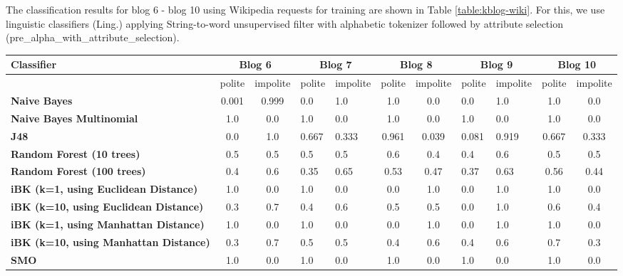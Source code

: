 \documentclass[conference]{IEEEtran}
\begin{document}
The classification results for blog 6 - blog 10 using Wikipedia requests for training are shown in Table \ref{table:kblog-wiki}. For this, we use linguistic classifiers (Ling.) applying String-to-word unsupervised filter with alphabetic tokenizer followed by attribute selection (pre\_alpha\_with\_attribute\_selection). 

\begin{table*}[htbp]
\caption{Classification results using Wikipedia requests for training for blog 6 - blog 10}
\centering
\vspace{5pt}
\begin{tabular}{|l|c|c|l|l|c|c|l|l|c|c|}
\hline
\textbf{Classifier} & \multicolumn{2}{|c|}{\textbf{Blog 6}} & \multicolumn{2}{|c|}{\textbf{Blog 7}} & \multicolumn{2}{|c|}{\textbf{Blog 8}} & \multicolumn{2}{|c|}{\textbf{Blog 9}} & \multicolumn{2}{|c|}{\textbf{Blog 10}} \\
\hline
& polite & impolite & polite & impolite & polite & impolite & polite & impolite & polite & impolite \\
\hline\hline
\textbf{Naive Bayes} & 0.001 & 0.999 & 0.0 & 1.0 & 1.0 & 0.0 & 0.0 & 1.0 & 1.0 & 0.0 \\ 
\hline
\textbf{Naive Bayes Multinomial} & 1.0 & 0.0 & 1.0 & 0.0 & 1.0 & 0.0 & 1.0 & 0.0 & 1.0 & 0.0 \\ 
\hline
\textbf{J48} & 0.0 & 1.0 & 0.667 & 0.333 & 0.961 & 0.039 & 0.081 & 0.919 & 0.667 & 0.333 \\ 
\hline
\textbf{Random Forest (10 trees)} & 0.5 & 0.5 & 0.5 & 0.5 & 0.6 & 0.4 & 0.4 & 0.6 & 0.5 & 0.5 \\ 
\hline
\textbf{Random Forest (100 trees)} & 0.4 & 0.6 & 0.35 & 0.65 & 0.53 & 0.47 & 0.37 & 0.63 & 0.56 & 0.44 \\ 
\hline
\textbf{iBK (k=1, using Euclidean Distance)} & 1.0 & 0.0 & 1.0 & 0.0 & 0.0 & 1.0 & 0.0 & 1.0 & 1.0 & 0.0 \\ 
\hline
\textbf{iBK (k=10, using Euclidean Distance)} & 0.3 & 0.7 & 0.4 & 0.6 & 0.5 & 0.5 & 0.0 & 1.0 & 0.6 & 0.4 \\ 
\hline
\textbf{iBK (k=1, using Manhattan Distance)} & 1.0 & 0.0 & 1.0 & 0.0 & 0.0 & 1.0 & 0.0 & 1.0 & 1.0 & 0.0 \\ 
\hline
\textbf{iBK (k=10, using Manhattan Distance)} & 0.3 & 0.7 & 0.5 & 0.5 & 0.4 & 0.6 & 0.4 & 0.6 & 0.7 & 0.3 \\ 
\hline
\textbf{SMO} & 1.0 & 0.0 & 1.0 & 0.0 & 1.0 & 0.0 & 1.0 & 0.0 & 1.0 & 0.0 \\ 
\hline
\hline
\end{tabular}
\label{table:kblog-wiki}
\end{table*}
\end{document}
